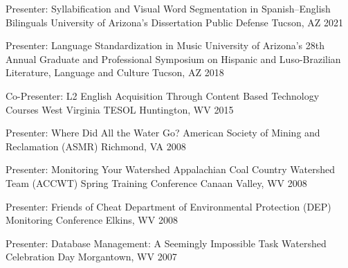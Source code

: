 


\begin{cvhonors}


\cvhonor
{Presenter: Syllabification and Visual Word Segmentation in Spanish--English Bilinguals} %
{University of Arizona’s Dissertation Public Defense} %
{Tucson, AZ} %
{2021} %


\cvhonor
{Presenter: Language Standardization in Music} %
{University of Arizona’s 28th Annual Graduate and Professional Symposium on Hispanic and Luso-Brazilian Literature, Language and Culture} %
{Tucson, AZ} %
{2018} %


\cvhonor
{Co-Presenter: L2 English Acquisition Through Content Based Technology Courses} %
{West Virginia TESOL} %
{Huntington, WV} %
{2015} %


\cvhonor
{Presenter: Where Did All the Water Go?} %
{American Society of Mining and Reclamation (ASMR)} %
{Richmond, VA} %
{2008} %


\cvhonor
{Presenter: Monitoring Your Watershed} %
{Appalachian Coal Country Watershed Team (ACCWT) Spring Training Conference} %
{Canaan Valley, WV} %
{2008} %


\cvhonor
{Presenter: Friends of Cheat} %
{Department of Environmental Protection (DEP) Monitoring Conference} %
{Elkins, WV} %
{2008} %


\cvhonor
{Presenter: Database Management: A Seemingly Impossible Task} %
{Watershed Celebration Day} %
{Morgantown, WV} %
{2007} %


\end{cvhonors}

